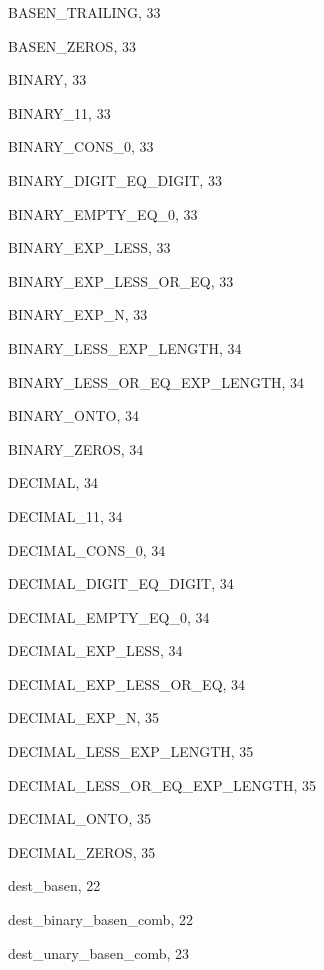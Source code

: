 \begin{theindex}
  \item {\ptt BASEN\_TRAILING}, 33
  \item {\ptt BASEN\_ZEROS}, 33
  \item {\ptt BINARY}, 33
  \item {\ptt BINARY\_11}, 33
  \item {\ptt BINARY\_CONS\_0}, 33
  \item {\ptt BINARY\_DIGIT\_EQ\_DIGIT}, 33
  \item {\ptt BINARY\_EMPTY\_EQ\_0}, 33
  \item {\ptt BINARY\_EXP\_LESS}, 33
  \item {\ptt BINARY\_EXP\_LESS\_OR\_EQ}, 33
  \item {\ptt BINARY\_EXP\_N}, 33
  \item {\ptt BINARY\_LESS\_EXP\_LENGTH}, 34
  \item {\ptt BINARY\_LESS\_OR\_EQ\_EXP\_LENGTH}, 34
  \item {\ptt BINARY\_ONTO}, 34
  \item {\ptt BINARY\_ZEROS}, 34

  \indexspace

  \item {\ptt DECIMAL}, 34
  \item {\ptt DECIMAL\_11}, 34
  \item {\ptt DECIMAL\_CONS\_0}, 34
  \item {\ptt DECIMAL\_DIGIT\_EQ\_DIGIT}, 34
  \item {\ptt DECIMAL\_EMPTY\_EQ\_0}, 34
  \item {\ptt DECIMAL\_EXP\_LESS}, 34
  \item {\ptt DECIMAL\_EXP\_LESS\_OR\_EQ}, 34
  \item {\ptt DECIMAL\_EXP\_N}, 35
  \item {\ptt DECIMAL\_LESS\_EXP\_LENGTH}, 35
  \item {\ptt DECIMAL\_LESS\_OR\_EQ\_EXP\_LENGTH}, 35
  \item {\ptt DECIMAL\_ONTO}, 35
  \item {\ptt DECIMAL\_ZEROS}, 35
  \item {\ptt dest\_basen}, 22
  \item {\ptt dest\_binary\_basen\_comb}, 22
  \item {\ptt dest\_unary\_basen\_comb}, 23

  \indexspace


\end{theindex}
